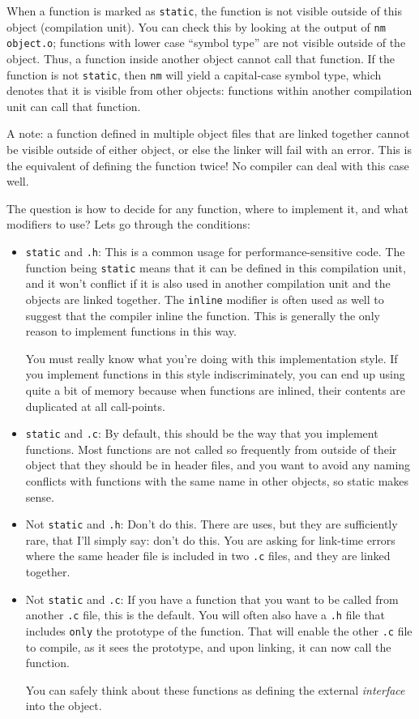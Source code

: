 \documentclass[11pt,onecolumn]{article}
\begin{document}
When a function is marked as {\tt static}, the function is not visible
outside of this object (compilation unit).  You can check this by
looking at the output of {\tt nm object.o}; functions with lower case
``symbol type'' are not visible outside of the object.  Thus, a
function inside another object cannot call that function.  If the
function is not {\tt static}, then {\tt nm} will yield a capital-case
symbol type, which denotes that it is visible from other objects:
functions within another compilation unit can call that function.

A note: a function defined in multiple object files that are linked
together cannot be visible outside of either object, or else the
linker will fail with an error.  This is the equivalent of defining
the function twice!  No compiler can deal with this case well.

The question is how to decide for any function, where to implement it,
and what modifiers to use?  Lets go through the conditions:
\begin{itemize}[itemsep=0pt,topsep=1pt,parsep=1pt,leftmargin=2.5em]
\item {\tt static} and {\tt *.h}: This is a common usage for
  performance-sensitive code.  The function being {\tt static} means
  that it can be defined in this compilation unit, and it won't
  conflict if it is also used in another compilation unit and the
  objects are linked together.  The {\tt inline} modifier is often
  used as well to suggest that the compiler inline the function.  This
  is generally the only reason to implement functions in this way.

  You must really know what you're doing with this implementation
  style.  If you implement functions in this style indiscriminately,
  you can end up using quite a bit of memory because when functions
  are inlined, their contents are duplicated at all call-points.
\item {\tt static} and {\tt *.c}: By default, this should be the way
  that you implement functions.  Most functions are not called so
  frequently from outside of their object that they should be in
  header files, and you want to avoid any naming conflicts with
  functions with the same name in other objects, so static makes
  sense.
\item Not {\tt static} and {\tt *.h}: Don't do this.  There are uses,
  but they are sufficiently rare, that I'll simply say: don't do this.
  You are asking for link-time errors where the same header file is
  included in two {\tt *.c} files, and they are linked together.
\item Not {\tt static} and {\tt *.c}: If you have a function that you
  want to be called from another {\tt *.c} file, this is the default.
  You will often also have a {\tt *.h} file that includes {\tt only}
  the prototype of the function.  That will enable the other {\tt *.c}
  file to compile, as it sees the prototype, and upon linking, it can
  now call the function.

  You can safely think about these functions as defining the external
  {\em interface} into the object.
\end{itemize}
\end{document}
